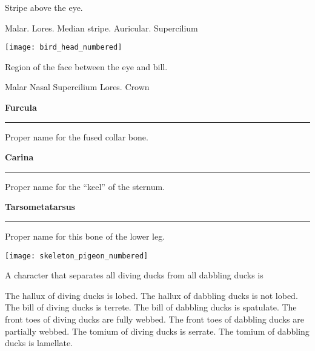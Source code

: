 \documentclass[12pt, addpoints]{exam}
\newcommand*\LabMatching[1]{
\ifprintanswers
	\textbf{#1}
\else
	\rule{2.0in}{0.4pt}
\fi
}
\newlength\matchlaba
\newlength\matchlabb
\newcommand\LabMatch[2]{%
	\setlength\matchlabb{0.98\linewidth}
	\addtolength\matchlabb{-\matchlaba}
	\parbox[t]{\matchlaba}{\LabMatching{#1}} \parbox[t]{\matchlabb}{#2}}
\newcommand{\bumppoints}[1]{%
	\addtocounter{numpoints}{#1}
}
\begin{document}
\begin{questions}
\begin{multicols}{2}
	
	\question
	Stripe above the eye.
	
	\begin{choices}
		\choice Malar.
		\choice Lores.
		\choice Median stripe.
		\choice Auricular.
		\correctchoice Supercilium
	\end{choices}
	
	\columnbreak
	
	\texttt{[image: bird\_head\_numbered]}
	
	\question
	Region of the face between the eye and bill.
	
	\begin{choices}
		\choice Malar
		\choice Nasal
		\choice Supercilium
		\correctchoice Lores.
		\choice Crown
	\end{choices}
	
\end{multicols}

\newpage

\bumppoints{6}
\begin{multicols}{2}
	
	\vspace*{2\baselineskip}
	
	\question\LabMatch{Furcula}{Proper name for the fused collar bone.}
	\vspace{0.6\baselineskip}
	
	\question\LabMatch{Carina}{Proper name for the “keel” of the sternum.}
	\vspace{0.6\baselineskip}
	
	\question\LabMatch{Tarsometatarsus}{Proper name for this bone of the lower leg.}
	\vspace{0.6\baselineskip}
	
	\columnbreak
	
	\vspace{-\baselineskip}
	
	\texttt{[image: skeleton\_pigeon\_numbered]}
	
\end{multicols}


\question
A character that separates all diving ducks from all dabbling ducks is

	\begin{choices}
		\correctchoice The hallux of diving ducks is lobed. The hallux of dabbling ducks is not lobed.
		\choice The bill of diving ducks is terrete. The bill of dabbling ducks is spatulate.
		\choice The front toes of diving ducks are fully webbed. The front toes of dabbling ducks are partially webbed.
		\choice The tomium of diving ducks is serrate. The tomium of dabbling ducks is lamellate.
	\end{choices}



\end{questions}
\end{document}
